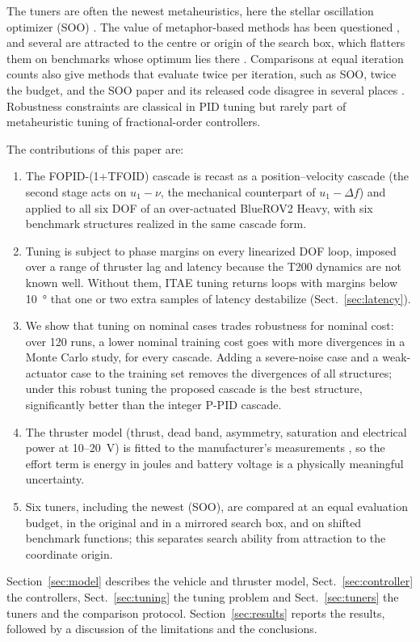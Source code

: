 \documentclass[review,12pt]{elsarticle}
\begin{document}
The tuners are often the newest metaheuristics, here the stellar oscillation optimizer (SOO)
\cite{rodan2025soo}. The value of metaphor-based methods has been questioned \cite{sorensen2015,camacho2023},
and several are attracted to the centre or origin of the search box, which flatters them on benchmarks whose
optimum lies there \cite{kudela2022}. Comparisons at equal iteration counts also give methods that evaluate
twice per iteration, such as SOO, twice the budget, and the SOO paper and its released code disagree in several
places \cite{mealpy_soo}. Robustness constraints are classical in PID tuning \cite{astrom2004} but rarely part of
metaheuristic tuning of fractional-order controllers.

The contributions of this paper are:
\begin{enumerate}
\item The FOPID-(1+TFOID) cascade is recast as a position--velocity cascade (the second stage acts on
  $u_1-\nu$, the mechanical counterpart of $u_1-\Delta f$) and applied to all six DOF of an over-actuated
  BlueROV2 Heavy, with six benchmark structures realized in the same cascade form.
\item Tuning is subject to phase margins on every linearized DOF loop, imposed over a range of thruster lag and
  latency because the T200 dynamics are not known well. Without them, ITAE tuning returns loops with margins
  below \SI{10}{\degree} that one or two extra samples of latency destabilize (Sect.~\ref{sec:latency}).
\item We show that tuning on nominal cases trades robustness for nominal cost: over 120 runs, a lower nominal
  training cost goes with more divergences in a Monte Carlo study, for every cascade. Adding a severe-noise case
  and a weak-actuator case to the training set removes the divergences of all structures; under this robust
  tuning the proposed cascade is the best structure, significantly better than the integer P-PID cascade.
\item The thruster model (thrust, dead band, asymmetry, saturation and electrical power at 10--20~V) is fitted
  to the manufacturer's measurements \cite{t200data}, so the effort term is energy in joules and battery
  voltage is a physically meaningful uncertainty.
\item Six tuners, including the newest (SOO), are compared at an equal evaluation budget, in the original
  and in a mirrored search box, and on shifted benchmark functions; this separates search ability from
  attraction to the coordinate origin.
\end{enumerate}
Section~\ref{sec:model} describes the vehicle and thruster model, Sect.~\ref{sec:controller} the controllers,
Sect.~\ref{sec:tuning} the tuning problem and Sect.~\ref{sec:tuners} the tuners and the comparison protocol.
Section~\ref{sec:results} reports the results, followed by a discussion of the limitations and the conclusions.
\end{document}
